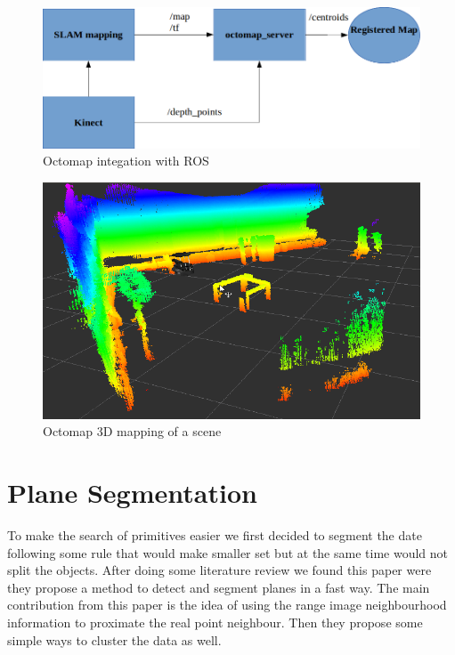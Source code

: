 \documentclass[fontsize=12pt]{article}
\begin{document}
\begin{figure}[H]
\begin{center}
\includegraphics[width=0.8\linewidth]{images/diagocto}
\caption{Octomap integation with ROS}
\label{fig:OctowithROS}
\end{center}
\end{figure}

\begin{figure}[H]
\begin{center}
\includegraphics[width=0.8\linewidth]{images/figoctomap}
\caption{Octomap 3D mapping of a scene}
\label{fig:octoscene}
\end{center}
\end{figure}





\section{Plane Segmentation}
\label{sec:planeseg}

To make the search of primitives easier we first decided to segment the date following some rule that would make smaller set but at the same time would not split the objects. After doing some literature review we found this paper were they propose a method to detect and segment planes in a fast way. The main contribution from this paper is the idea of using the range image neighbourhood information to proximate the real point neighbour. Then they propose some simple ways to cluster the data as well.\\
\end{document}

